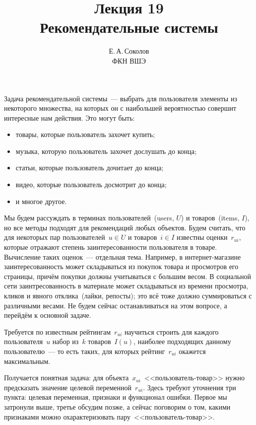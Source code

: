 \documentclass[12pt,fleqn]{article}
\begin{document}
\title{Лекция 19\\Рекомендательные системы}
\author{Е.\,А.\,Соколов\\ФКН ВШЭ}
\maketitle

Задача рекомендательной системы~--- выбрать для пользователя элементы из некоторого множества,
на которых он с наибольшей вероятностью совершит интересные нам действия.
Это могут быть:
\begin{itemize}
    \item товары, которые пользователь захочет купить;
    \item музыка, которую пользователь захочет дослушать до конца;
    \item статьи, которые пользователь дочитает до конца;
    \item видео, которые пользователь досмотрит до конца;
    \item и многое другое.
\end{itemize}

Мы будем рассуждать в терминах пользователей~(users, $U$) и товаров~(items, $I$),
но все методы подходят для рекомендаций любых объектов.
Будем считать, что для некоторых пар пользователей~$u \in U$ и товаров~$i \in I$ известны
оценки~$r_{ui}$, которые отражают степень заинтересованности пользователя в товаре.
Вычисление таких оценок~--- отдельная тема.
Например, в интернет-магазине заинтересованность может складываться из покупок товара
и просмотров его страницы, причём покупки должны учитываться с большим весом.
В социальной сети заинтресованность в материале может складываться из времени просмотра,
кликов и явного отклика~(лайки, репосты); это всё тоже должно суммироваться с различными весами.
Не будем сейчас останавливаться на этом вопросе, а перейдём к основной задаче.

Требуется по известным рейтингам~$r_{ui}$ научиться строить для каждого пользователя~$u$
набор из~$k$ товаров~$I(u)$, наиболее подходящих данному пользователю~--- то есть таких,
для которых рейтинг~$r_{ui}$ окажется максимальным.

Получается понятная задача: для объекта~$x_{ui}$~<<пользователь-товар>> нужно предсказать значение
целевой переменной~$r_{ui}$.
Здесь требуют уточнения три пункта: целевая переменная, признаки и функционал ошибки.
Первое мы затронули выше, третье обсудим позже, а сейчас поговорим о том,
какими признаками можно охарактеризовать пару~<<пользователь-товар>>.
\end{document}
